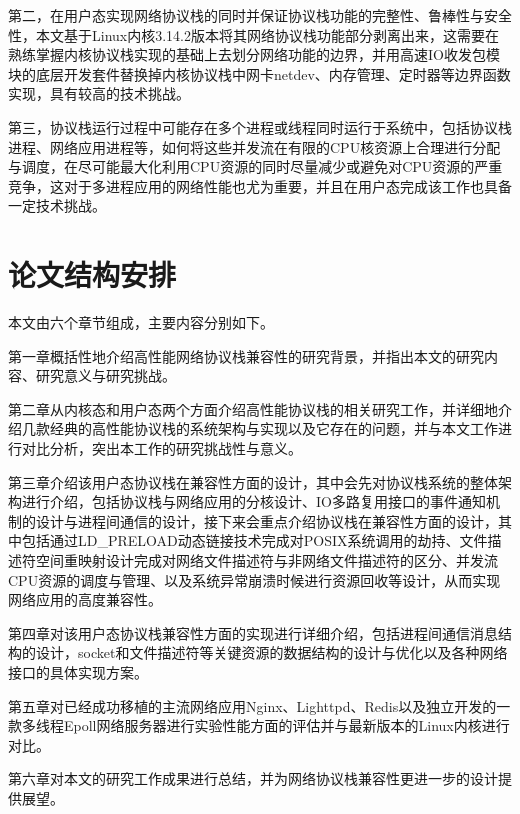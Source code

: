 第二，在用户态实现网络协议栈的同时并保证协议栈功能的完整性、鲁棒性与安全性，本文基于Linux内核3.14.2版本将其网络协议栈功能部分剥离出来，这需要在熟练掌握内核协议栈实现的基础上去划分网络功能的边界，并用高速IO收发包模块的底层开发套件替换掉内核协议栈中网卡netdev、内存管理、定时器等边界函数实现，具有较高的技术挑战。

第三，协议栈运行过程中可能存在多个进程或线程同时运行于系统中，包括协议栈进程、网络应用进程等，如何将这些并发流在有限的CPU核资源上合理进行分配与调度，在尽可能最大化利用CPU资源的同时尽量减少或避免对CPU资源的严重竞争，这对于多进程应用的网络性能也尤为重要，并且在用户态完成该工作也具备一定技术挑战。

\section{论文结构安排}
本文由六个章节组成，主要内容分别如下。

第一章概括性地介绍高性能网络协议栈兼容性的研究背景，并指出本文的研究内容、研究意义与研究挑战。

第二章从内核态和用户态两个方面介绍高性能协议栈的相关研究工作，并详细地介绍几款经典的高性能协议栈的系统架构与实现以及它存在的问题，并与本文工作进行对比分析，突出本工作的研究挑战性与意义。

第三章介绍该用户态协议栈在兼容性方面的设计，其中会先对协议栈系统的整体架构进行介绍，包括协议栈与网络应用的分核设计、IO多路复用接口的事件通知机制的设计与进程间通信的设计，接下来会重点介绍协议栈在兼容性方面的设计，其中包括通过LD\_PRELOAD动态链接技术完成对POSIX系统调用的劫持、文件描述符空间重映射设计完成对网络文件描述符与非网络文件描述符的区分、并发流CPU资源的调度与管理、以及系统异常崩溃时候进行资源回收等设计，从而实现网络应用的高度兼容性。

第四章对该用户态协议栈兼容性方面的实现进行详细介绍，包括进程间通信消息结构的设计，socket和文件描述符等关键资源的数据结构的设计与优化以及各种网络接口的具体实现方案。

第五章对已经成功移植的主流网络应用Nginx、Lighttpd、Redis以及独立开发的一款多线程Epoll网络服务器进行实验性能方面的评估并与最新版本的Linux内核进行对比。

第六章对本文的研究工作成果进行总结，并为网络协议栈兼容性更进一步的设计提供展望。

